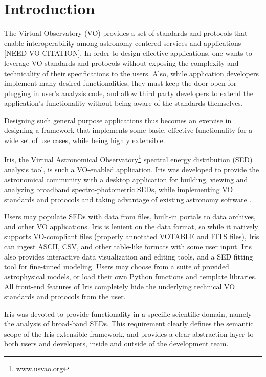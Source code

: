 \label{sec:introduction}
\section{Introduction} 
The Virtual Observatory (VO) provides a set of standards and protocols that enable interoperability among astronomy-centered services and applications [NEED VO CITATION].
In order to design effective applications, one wants to leverage VO standards and protocols without exposing the complexity and technicality of their specifications to the users. Also, while application developers implement many desired functionalities, they must keep the door open for plugging in user's analysis code, and allow third party developers to extend the application's functionality without being aware of the standards themselves.

Designing such general purpose applications thus becomes an exercise in designing a framework that implements some basic, effective functionality for a wide set of use cases, while being highly extensible.

Iris, the Virtual Astronomical Observatory\footnote{www.usvao.org} \cite{2012SPIE.8449E..0HB} spectral energy distribution (SED) analysis tool, is such a VO-enabled application. Iris was developed to provide the astronomical community with a desktop application for building, viewing and analyzing broadband spectro-photometric SEDs, while implementing VO standards and protocols and taking advantage of existing astronomy software \cite{2012ASPC..461..893D,2013AAS...22124038L}.

Users may populate SEDs with data from files, built-in portals to data archives, and other VO applications. Iris is lenient on the data format, so while it natively supports VO-compliant files (properly annotated VOTABLE and FITS files), Iris can ingest ASCII, CSV, and other table-like formats with some user input. Iris also provides interactive data visualization and editing tools, and a SED fitting tool for fine-tuned modeling. Users may choose from a suite of provided astrophysical models, or load their own Python functions and template libraries. All front-end features of Iris completely hide the underlying technical VO standards and protocols from the user.

Iris was devoted to provide functionality in a specific scientific domain, namely the analysis of broad-band SEDs. This requirement clearly defines the semantic scope of the  Iris extensible framework, and provides a clear abstraction layer to both users and developers, inside and outside of the development team.

